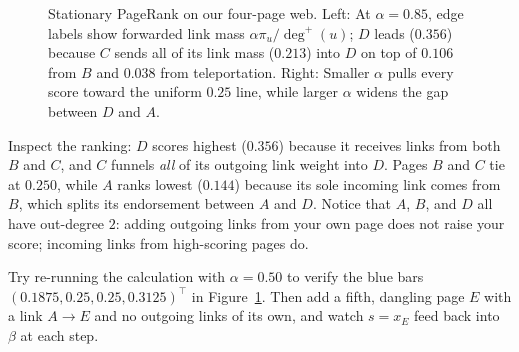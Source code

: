 \begin{figure}[htbp]
\caption{Stationary PageRank on our four-page web. Left: At $\alpha=0.85$, edge labels show forwarded link mass $\alpha\pi_u/\deg^+(u)$; $D$ leads ($0.356$) because $C$ sends all of its link mass ($0.213$) into $D$ on top of $0.106$ from $B$ and $0.038$ from teleportation. Right: Smaller $\alpha$ pulls every score toward the uniform $0.25$ line, while larger $\alpha$ widens the gap between $D$ and $A$.}
\label{ch36:fig-trace-bars}
\end{figure}

\begin{labbox}
Inspect the ranking: $D$ scores highest ($0.356$) because it receives links from both $B$ and $C$, and $C$ funnels \emph{all} of its outgoing link weight into $D$. Pages $B$ and $C$ tie at $0.250$, while $A$ ranks lowest ($0.144$) because its sole incoming link comes from $B$, which splits its endorsement between $A$ and $D$. Notice that $A$, $B$, and $D$ all have out-degree $2$: adding outgoing links from your own page does not raise your score; incoming links from high-scoring pages do.

Try re-running the calculation with $\alpha = 0.50$ to verify the blue bars $(0.1875, 0.25, 0.25, 0.3125)^\top$ in Figure~\ref{ch36:fig-trace-bars}. Then add a fifth, dangling page $E$ with a link $A \to E$ and no outgoing links of its own, and watch $s = x_E$ feed back into $\beta$ at each step.
\end{labbox}

